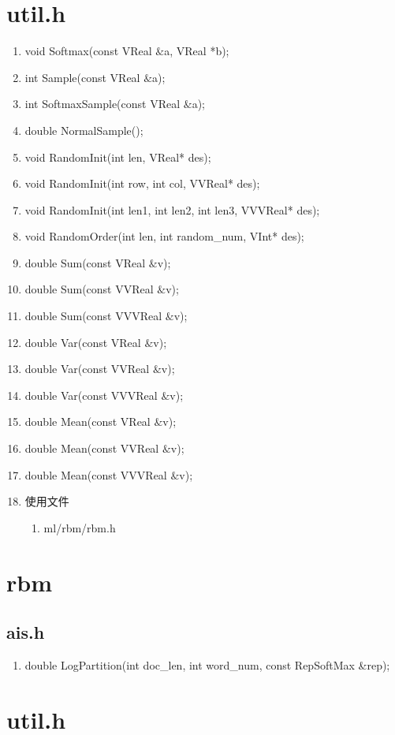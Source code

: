 \section{util.h}
\begin{enumerate}
\item void Softmax(const VReal $\&$a, VReal *b);
\item int Sample(const VReal $\&$a);
\item int SoftmaxSample(const VReal $\&$a);
\item double NormalSample();

\item void RandomInit(int len, VReal* des);
\item void RandomInit(int row, int col, VVReal* des);
\item void RandomInit(int len1, int len2, int len3, VVVReal* des);

\item void RandomOrder(int len, int random\_num, VInt* des);

\item double Sum(const VReal $\&$v);
\item double Sum(const VVReal $\&$v);
\item double Sum(const VVVReal $\&$v);

\item double Var(const VReal $\&$v);
\item double Var(const VVReal $\&$v);
\item double Var(const VVVReal $\&$v);

\item double Mean(const VReal $\&$v);
\item double Mean(const VVReal $\&$v);
\item double Mean(const VVVReal $\&$v);
\item 使用文件
\begin{enumerate}
\item ml/rbm/rbm.h
\end{enumerate}
\end{enumerate}

\section{rbm}
\subsection{ais.h}
\begin{enumerate}
\item double LogPartition(int doc\_len, int word\_num, const RepSoftMax \&rep);
\end{enumerate}

\section{util.h}
